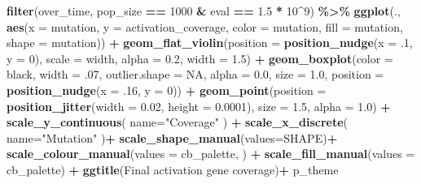 \documentclass[
]{book}
\newenvironment{Shaded}{\begin{snugshade}}{\end{snugshade}}
\newcommand{\AttributeTok}[1]{\textcolor[rgb]{0.13,0.29,0.53}{#1}}
\newcommand{\ConstantTok}[1]{\textcolor[rgb]{0.56,0.35,0.01}{#1}}
\newcommand{\DecValTok}[1]{\textcolor[rgb]{0.00,0.00,0.81}{#1}}
\newcommand{\FloatTok}[1]{\textcolor[rgb]{0.00,0.00,0.81}{#1}}
\newcommand{\FunctionTok}[1]{\textcolor[rgb]{0.13,0.29,0.53}{\textbf{#1}}}
\newcommand{\NormalTok}[1]{#1}
\newcommand{\SpecialCharTok}[1]{\textcolor[rgb]{0.81,0.36,0.00}{\textbf{#1}}}
\newcommand{\StringTok}[1]{\textcolor[rgb]{0.31,0.60,0.02}{#1}}
\begin{document}
\begin{Shaded}
\begin{Highlighting}[]
\FunctionTok{filter}\NormalTok{(over\_time, pop\_size }\SpecialCharTok{==} \DecValTok{1000} \SpecialCharTok{\&}\NormalTok{ eval }\SpecialCharTok{==} \FloatTok{1.5} \SpecialCharTok{*} \DecValTok{10}\SpecialCharTok{\^{}}\DecValTok{9}\NormalTok{) }\SpecialCharTok{\%\textgreater{}\%}
  \FunctionTok{ggplot}\NormalTok{(., }\FunctionTok{aes}\NormalTok{(}\AttributeTok{x =}\NormalTok{ mutation, }\AttributeTok{y =}\NormalTok{ activation\_coverage, }\AttributeTok{color =}\NormalTok{ mutation, }\AttributeTok{fill =}\NormalTok{ mutation, }\AttributeTok{shape =}\NormalTok{ mutation)) }\SpecialCharTok{+}
  \FunctionTok{geom\_flat\_violin}\NormalTok{(}\AttributeTok{position =} \FunctionTok{position\_nudge}\NormalTok{(}\AttributeTok{x =}\NormalTok{ .}\DecValTok{1}\NormalTok{, }\AttributeTok{y =} \DecValTok{0}\NormalTok{), }\AttributeTok{scale =} \StringTok{\textquotesingle{}width\textquotesingle{}}\NormalTok{, }\AttributeTok{alpha =} \FloatTok{0.2}\NormalTok{, }\AttributeTok{width =} \FloatTok{1.5}\NormalTok{) }\SpecialCharTok{+}
  \FunctionTok{geom\_boxplot}\NormalTok{(}\AttributeTok{color =} \StringTok{\textquotesingle{}black\textquotesingle{}}\NormalTok{, }\AttributeTok{width =}\NormalTok{ .}\DecValTok{07}\NormalTok{, }\AttributeTok{outlier.shape =} \ConstantTok{NA}\NormalTok{, }\AttributeTok{alpha =} \FloatTok{0.0}\NormalTok{, }\AttributeTok{size =} \FloatTok{1.0}\NormalTok{, }\AttributeTok{position =} \FunctionTok{position\_nudge}\NormalTok{(}\AttributeTok{x =}\NormalTok{ .}\DecValTok{16}\NormalTok{, }\AttributeTok{y =} \DecValTok{0}\NormalTok{)) }\SpecialCharTok{+}
  \FunctionTok{geom\_point}\NormalTok{(}\AttributeTok{position =} \FunctionTok{position\_jitter}\NormalTok{(}\AttributeTok{width =} \FloatTok{0.02}\NormalTok{, }\AttributeTok{height =} \FloatTok{0.0001}\NormalTok{), }\AttributeTok{size =} \FloatTok{1.5}\NormalTok{, }\AttributeTok{alpha =} \FloatTok{1.0}\NormalTok{) }\SpecialCharTok{+}
  \FunctionTok{scale\_y\_continuous}\NormalTok{(}
    \AttributeTok{name=}\StringTok{"Coverage"}
\NormalTok{  ) }\SpecialCharTok{+}
  \FunctionTok{scale\_x\_discrete}\NormalTok{(}
    \AttributeTok{name=}\StringTok{"Mutation"}
\NormalTok{  )}\SpecialCharTok{+}
  \FunctionTok{scale\_shape\_manual}\NormalTok{(}\AttributeTok{values=}\NormalTok{SHAPE)}\SpecialCharTok{+}
  \FunctionTok{scale\_colour\_manual}\NormalTok{(}\AttributeTok{values =}\NormalTok{ cb\_palette, ) }\SpecialCharTok{+}
  \FunctionTok{scale\_fill\_manual}\NormalTok{(}\AttributeTok{values =}\NormalTok{ cb\_palette) }\SpecialCharTok{+}
  \FunctionTok{ggtitle}\NormalTok{(}\StringTok{\textquotesingle{}Final activation gene coverage\textquotesingle{}}\NormalTok{)}\SpecialCharTok{+}
\NormalTok{  p\_theme}
\end{Highlighting}
\end{Shaded}
\end{document}
